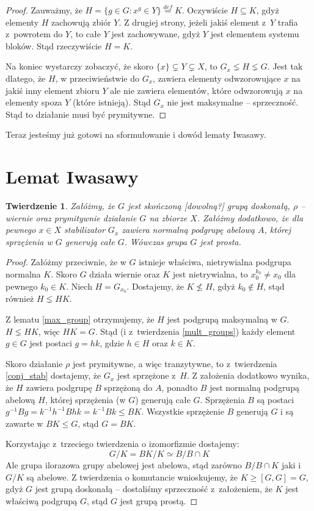 \documentclass[licencjacka]{pracamgr}
\newtheorem{thh}{Twierdzenie}[section]
\begin{document}
\begin{proof}
Zauważmy, że $H = \{ g \in G \colon x^g \in Y\} \stackrel{def}{=} K$. 
Oczywiście $H \subseteq K$, gdyż elementy $H$ zachowują zbiór $Y$.
Z drugiej strony, jeżeli jakiś element z~$Y$ trafia z~powrotem do $Y$, to całe $Y$ jest zachowywane, 
gdyż $Y$ jest elementem systemu bloków.
Stąd rzeczywiście $H = K$.

Na koniec wystarczy zobaczyć, że skoro $\{x\} \subsetneq  Y \subsetneq X$,
to $G_x \lneq H \lneq G$.
Jest tak dlatego, że $H$, w przeciwieństwie do $G_x$, zawiera elementy odwzorowujące $x$ na jakiś inny element zbioru $Y$
ale nie zawiera elementów, które odwzorowują $x$ na elementy spoza $Y$ (które istnieją).
Stąd $G_x$ nie jest maksymalne -- sprzeczność.
Stąd to działanie musi być prymitywne.
\end{proof}

Teraz jesteśmy już gotowi na sformułowanie i dowód lematy Iwasawy.

\section{Lemat Iwasawy}

\begin{thh}
	Załóżmy, że $G$ jest skończoną [dowolną?] grupą doskonałą, $\rho$ -- wiernie oraz prymitywnie działanie $G$ na zbiorze $X$.
	Załóżmy dodatkowo, że dla pewnego $x \in X$ stabilizator $G_x$ zawiera normalną podgrupę abelową $A$, 
	której sprzężenia w $G$ generują całe $G$.
	Wówczas grupa $G$ jest prosta.
\end{thh}
\begin{proof}
	Załóżmy przeciwnie, że w $G$ istnieje właściwa, nietrywialna podgrupa normalna $K$.
	Skoro $G$ działa wiernie oraz $K$ jest nietrywialna, to $x_0^{k_0} \ne x_0$ dla pewnego $k_0 \in K$.
	Niech $H = G_{x_0}$.
	Dostajemy, że $K \nleq H$, gdyż $k_0 \not \in H$, stąd również $H \lneq H K$.

	Z lematu \ref{max_group} otrzymujemy, że $H$ jest podgrupą maksymalną w $G$.
	$H \lneq H K$, więc $H K = G$.
	Stąd (i z~twierdzenia \ref{mult_groups}) każdy element $g \in G$ jest postaci $g = h k$, gdzie $h \in H$ oraz $k \in K$.

	Skoro działanie $\rho$ jest prymitywne, a więc tranzytywne, to z~twierdzenia \ref{conj_stab}
	dostajemy, że $G_x$ jest sprzężone z~$H$.
	Z założenia dodatkowo wynika, że $H$ zawiera podgrupę $B$ sprzężoną do $A$, 
	ponadto $B$ jest normalną podgrupą abelową $H$, której sprzężenia (w $G$) generują całe $G$.
	Sprzężenia $B$ są postaci $g^{-1} B g = k^{-1} h^{-1} B h k = k^{-1} B k \le B K$.
	Wszystkie sprzężenie $B$ generują $G$ i są zawarte w $B K \le G$, stąd $G = B K$.

	Korzystając z~trzeciego twierdzenia o izomorfizmie dostajemy:
	$$ G/K = BK/K \simeq B/B\cap K$$
	Ale grupa ilorazowa grupy abelowej jest abelowa, stąd zarówno $B/B\cap K$ jaki i $G/K$ są abelowe.
	Z twierdzenia o komutancie wnioskujemy, że $K \ge [G, G] = G$, gdyż $G$ jest grupą doskonałą --
	dostaliśmy sprzeczność z~założeniem, że $K$ jest właściwą podgrupą $G$, stąd $G$ jest grupą prostą.
\end{proof}
\end{document}
